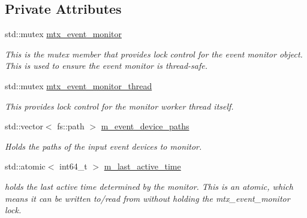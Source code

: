 \subsection*{Private Attributes}
\begin{DoxyCompactItemize}
\item 
\mbox{\label{classEventDetect_1_1Monitor_ac0f7892aadf252355ab285b9961f8359}} 
std\+::mutex \mbox{\hyperlink{classEventDetect_1_1Monitor_ac0f7892aadf252355ab285b9961f8359}{mtx\+\_\+event\+\_\+monitor}}
\begin{DoxyCompactList}\small\item\em This is the mutex member that provides lock control for the event monitor object. This is used to ensure the event monitor is thread-\/safe. \end{DoxyCompactList}\item 
\mbox{\label{classEventDetect_1_1Monitor_a5a9db8559cfc759ca556fc1dca5b5b04}} 
std\+::mutex \mbox{\hyperlink{classEventDetect_1_1Monitor_a5a9db8559cfc759ca556fc1dca5b5b04}{mtx\+\_\+event\+\_\+monitor\+\_\+thread}}
\begin{DoxyCompactList}\small\item\em This provides lock control for the monitor worker thread itself. \end{DoxyCompactList}\item 
\mbox{\label{classEventDetect_1_1Monitor_ae703991c95b0f32857e034dde9e33bf4}} 
std\+::vector$<$ fs\+::path $>$ \mbox{\hyperlink{classEventDetect_1_1Monitor_ae703991c95b0f32857e034dde9e33bf4}{m\+\_\+event\+\_\+device\+\_\+paths}}
\begin{DoxyCompactList}\small\item\em Holds the paths of the input event devices to monitor. \end{DoxyCompactList}\item 
\mbox{\label{classEventDetect_1_1Monitor_a2c8731fb47d6d186d33098193d851ea5}} 
std\+::atomic$<$ int64\+\_\+t $>$ \mbox{\hyperlink{classEventDetect_1_1Monitor_a2c8731fb47d6d186d33098193d851ea5}{m\+\_\+last\+\_\+active\+\_\+time}}
\begin{DoxyCompactList}\small\item\em holds the last active time determined by the monitor. This is an atomic, which means it can be written to/read from without holding the mtx\+\_\+event\+\_\+monitor lock. \end{DoxyCompactList}\item 

\end{DoxyCompactItemize}
